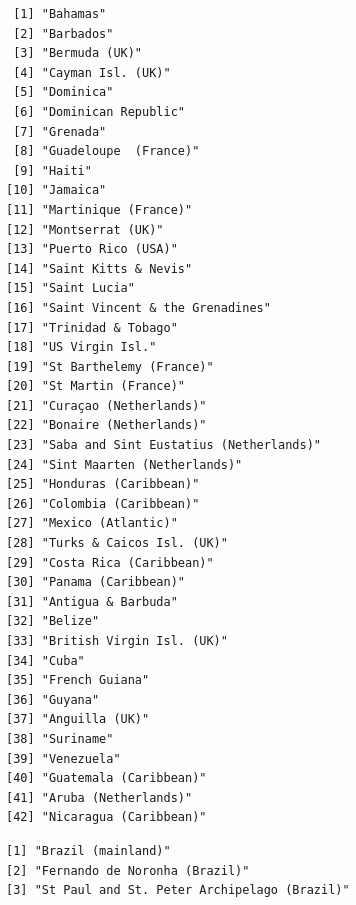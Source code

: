 \documentclass[
]{article}
\newenvironment{Shaded}{\begin{snugshade}}{\end{snugshade}}
\newcommand{\CommentTok}[1]{\textcolor[rgb]{0.37,0.37,0.37}{#1}}
\newcommand{\FunctionTok}[1]{\textcolor[rgb]{0.28,0.35,0.67}{#1}}
\newcommand{\NormalTok}[1]{\textcolor[rgb]{0.00,0.23,0.31}{#1}}
\newcommand{\SpecialCharTok}[1]{\textcolor[rgb]{0.37,0.37,0.37}{#1}}
\newcommand{\StringTok}[1]{\textcolor[rgb]{0.13,0.47,0.30}{#1}}
\begin{document}
\begin{verbatim}
 [1] "Bahamas"                              
 [2] "Barbados"                             
 [3] "Bermuda (UK)"                         
 [4] "Cayman Isl. (UK)"                     
 [5] "Dominica"                             
 [6] "Dominican Republic"                   
 [7] "Grenada"                              
 [8] "Guadeloupe  (France)"                 
 [9] "Haiti"                                
[10] "Jamaica"                              
[11] "Martinique (France)"                  
[12] "Montserrat (UK)"                      
[13] "Puerto Rico (USA)"                    
[14] "Saint Kitts & Nevis"                  
[15] "Saint Lucia"                          
[16] "Saint Vincent & the Grenadines"       
[17] "Trinidad & Tobago"                    
[18] "US Virgin Isl."                       
[19] "St Barthelemy (France)"               
[20] "St Martin (France)"                   
[21] "Curaçao (Netherlands)"                
[22] "Bonaire (Netherlands)"                
[23] "Saba and Sint Eustatius (Netherlands)"
[24] "Sint Maarten (Netherlands)"           
[25] "Honduras (Caribbean)"                 
[26] "Colombia (Caribbean)"                 
[27] "Mexico (Atlantic)"                    
[28] "Turks & Caicos Isl. (UK)"             
[29] "Costa Rica (Caribbean)"               
[30] "Panama (Caribbean)"                   
[31] "Antigua & Barbuda"                    
[32] "Belize"                               
[33] "British Virgin Isl. (UK)"             
[34] "Cuba"                                 
[35] "French Guiana"                        
[36] "Guyana"                               
[37] "Anguilla (UK)"                        
[38] "Suriname"                             
[39] "Venezuela"                            
[40] "Guatemala (Caribbean)"                
[41] "Aruba (Netherlands)"                  
[42] "Nicaragua (Caribbean)"                
\end{verbatim}

\begin{Shaded}
\end{Shaded}

\begin{verbatim}
[1] "Brazil (mainland)"                         
[2] "Fernando de Noronha (Brazil)"              
[3] "St Paul and St. Peter Archipelago (Brazil)"
\end{verbatim}
\end{document}
